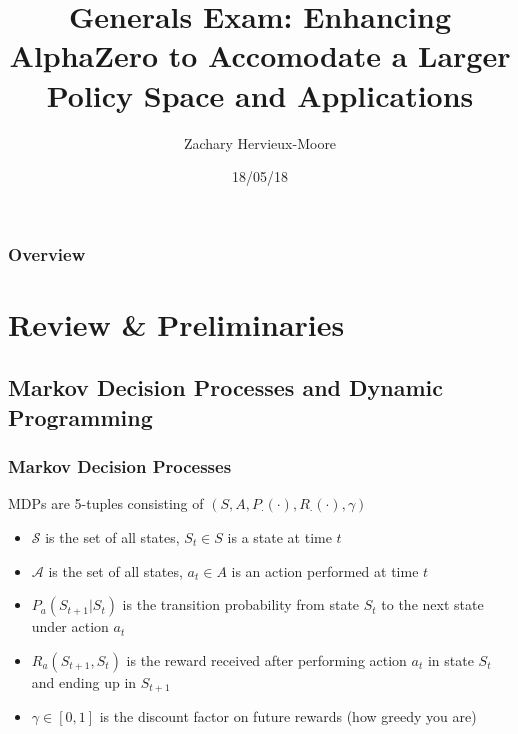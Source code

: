 \documentclass{beamer}
\title[Short title]{Generals Exam: Enhancing AlphaZero to Accomodate a Larger Policy Space and Applications} %
\author{Zachary Hervieux-Moore} %
\date{18/05/18} %
\begin{document}
\begin{frame}
\titlepage %
\end{frame}

\begin{frame}
\frametitle{Overview} %
\tableofcontents %
\end{frame}


\section{Review \& Preliminaries} %

\subsection{Markov Decision Processes and Dynamic Programming} %


\begin{frame}
  \frametitle{Markov Decision Processes}

  MDPs are 5-tuples consisting of $(S, A, P_{\cdot}(\cdot), R_{\cdot}(\cdot), \gamma)$
  \begin{itemize}
    \item $\mathcal{S}$ is the set of all states, $S_t \in S$ is a state at time $t$
    \item $\mathcal{A}$ is the set of all states, $a_t \in A$ is an action performed at time $t$
    \item $P_a(S_{t+1} | S_t)$ is the transition probability from state $S_t$ to the next state under action $a_t$
    \item $R_a(S_{t+1}, S_t)$ is the reward received after performing action $a_t$ in state $S_t$ and ending up in $S_{t+1}$
    \item $\gamma \in [0,1]$ is the discount factor on future rewards (how greedy you are)
  \end{itemize}
\end{frame}
\end{document}
